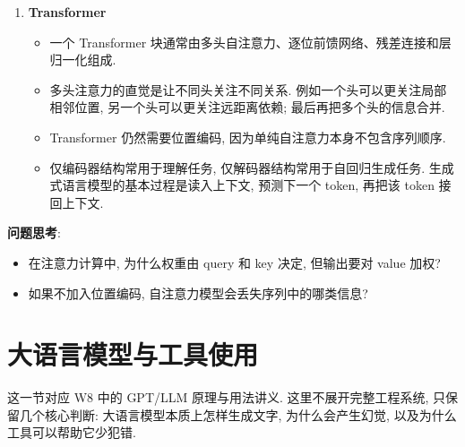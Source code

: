 \documentclass{../nndlcourse}
\begin{document}
\begin{enumerate}
\begin{itemize}
    \end{itemize}

    \item \textbf{Transformer}
    \begin{itemize}
        \item 一个 Transformer 块通常由多头自注意力、逐位前馈网络、残差连接和层归一化组成.
        \item 多头注意力的直觉是让不同头关注不同关系. 例如一个头可以更关注局部相邻位置, 另一个头可以更关注远距离依赖; 最后再把多个头的信息合并.
        \item Transformer 仍然需要位置编码, 因为单纯自注意力本身不包含序列顺序.
        \item 仅编码器结构常用于理解任务, 仅解码器结构常用于自回归生成任务. 生成式语言模型的基本过程是读入上下文, 预测下一个 token, 再把该 token 接回上下文.
    \end{itemize}
\end{enumerate}

\textbf{问题思考}:
\begin{itemize}
    \item 在注意力计算中, 为什么权重由 query 和 key 决定, 但输出要对 value 加权?
    \item 如果不加入位置编码, 自注意力模型会丢失序列中的哪类信息?
\end{itemize}

\section{大语言模型与工具使用}

这一节对应  W8 中的 GPT/LLM 原理与用法讲义. 这里不展开完整工程系统, 只保留几个核心判断: 大语言模型本质上怎样生成文字, 为什么会产生幻觉, 以及为什么工具可以帮助它少犯错.
\end{document}
